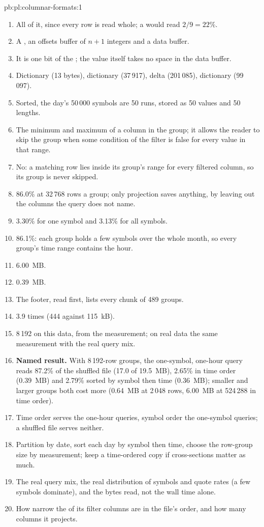 \begin{solution}{pb:pl:columnar-formats:1}
\begin{enumerate}
\item All of it, since every row is read whole; a  would read $2/9 = 22\%$.
\item A , an offsets buffer of $n+1$ integers and a data buffer.
\item It is one bit of the ; the value itself takes no space in the data buffer.
\item Dictionary (13 bytes), dictionary (37\,917), delta (201\,085), dictionary (99\,097).
\item Sorted, the day's 50\,000 symbols are 50 runs, stored as 50 values and 50 lengths.
\item The minimum and maximum of a column in the group; it allows the reader to skip the group when some condition of the filter
is false for every value in that range.
\item No: a matching row lies inside its group's range for every filtered column, so its group is never skipped.
\item 86.0\% at 32\,768 rows a group; only projection saves anything, by leaving out the columns the query does not name.
\item 3.30\% for one symbol and 3.13\% for all symbols.
\item 86.1\%: each group holds a few symbols over the whole month, so every group's time range contains the hour.
\item 6.00~MB.
\item 0.39~MB.
\item The footer, read first, lists every chunk of 489 groups.
\item 3.9 times (444 against 115~kB).
\item 8\,192 on this data, from the measurement; on real data the same measurement with the real query mix.
\item \textbf{Named result.} With 8\,192-row groups, the one-symbol, one-hour query reads 87.2\% of the shuffled file (17.0 of
19.5~MB), 2.65\% in time order (0.39~MB) and 2.79\% sorted by symbol then time (0.36~MB); smaller and larger groups both cost
more (0.64~MB at 2\,048 rows, 6.00~MB at 524\,288 in time order).
\item Time order serves the one-hour queries, symbol order the one-symbol queries; a shuffled file serves neither.
\item Partition by date, sort each day by symbol then time, choose the row-group size by measurement; keep a time-ordered copy if
cross-sections matter as much.
\item The real query mix, the real distribution of symbols and quote rates (a few symbols dominate), and the bytes read, not the
wall time alone.
\item How narrow the  of its filter columns are in the file's order, and how many columns it projects.
\end{enumerate}
\end{solution}

